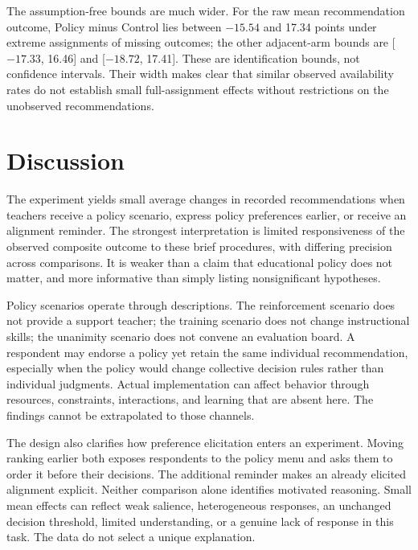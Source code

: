 
The assumption-free bounds are much wider. For the raw mean recommendation outcome, Policy minus Control lies between $-15.54$ and 17.34 points under extreme assignments of missing outcomes; the other adjacent-arm bounds are [$-17.33$, 16.46] and [$-18.72$, 17.41]. These are identification bounds, not confidence intervals. Their width makes clear that similar observed availability rates do not establish small full-assignment effects without restrictions on the unobserved recommendations.

\section{Discussion}
The experiment yields small average changes in recorded recommendations when teachers receive a policy scenario, express policy preferences earlier, or receive an alignment reminder. The strongest interpretation is limited responsiveness of the observed composite outcome to these brief procedures, with differing precision across comparisons. It is weaker than a claim that educational policy does not matter, and more informative than simply listing nonsignificant hypotheses.

Policy scenarios operate through descriptions. The reinforcement scenario does not provide a support teacher; the training scenario does not change instructional skills; the unanimity scenario does not convene an evaluation board. A respondent may endorse a policy yet retain the same individual recommendation, especially when the policy would change collective decision rules rather than individual judgments. Actual implementation can affect behavior through resources, constraints, interactions, and learning that are absent here. The findings cannot be extrapolated to those channels.

The design also clarifies how preference elicitation enters an experiment. Moving ranking earlier both exposes respondents to the policy menu and asks them to order it before their decisions. The additional reminder makes an already elicited alignment explicit. Neither comparison alone identifies motivated reasoning. Small mean effects can reflect weak salience, heterogeneous responses, an unchanged decision threshold, limited understanding, or a genuine lack of response in this task. The data do not select a unique explanation.

